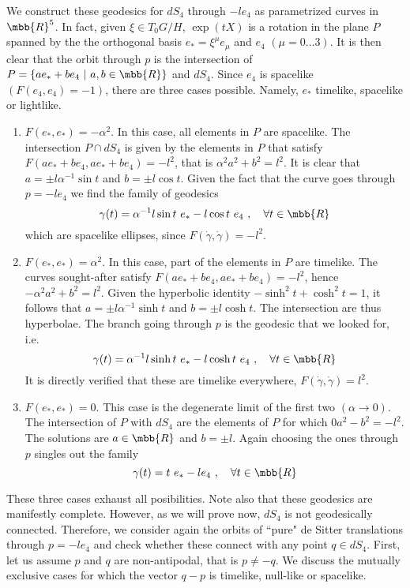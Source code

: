 \documentclass[11pt]{article}
\begin{document}
We construct these geodesics for $dS_4$ through $-le_4$ as 
parametrized curves in $\mbb{R}^5$. In fact, given $\xi \in 
T_0G/H$, $\exp (tX)$ is a rotation in the plane $P$ spanned by 
the the orthogonal basis $e_\ast = \xi^\mu e_\mu$ and $e_4$ $(\mu 
= 0\ldots 3)$.  It is then clear that the orbit through $p$ is 
the intersection of $P = \{a e_\ast + b e_4~|~a,b \in \mbb{R}\}$ 
and $dS_4$.  Since $e_4$ is spacelike $(F(e_4,e_4) = -1)$, there 
are three cases possible. Namely, $e_\ast$ timelike, spacelike or 
lightlike.
%
\begin{enumerate}
	\item $F(e_\ast,e_\ast) = -\alpha^2$. In this case, all 
		elements in $P$ are spacelike. The intersection $P \cap dS_4$ 
		is given by the elements in $P$ that satisfy $F(a e_\ast + b 
		e_4, a e_\ast + b e_4) = -l^2$, that is $\alpha^2 a^2 + b^2 = 
		l^2$. It is clear that $a= \pm l\alpha^{-1} \sin t$ and $b= 
		\pm l\cos t$. Given the fact that the curve goes through $p = 
		-le_4$ we find the family of geodesics
		\begin{equation}\label{eq:geo_space}
			\gamma(t) = \alpha^{-1}l\sin t~e_\ast - l \cos t~e_4~,
			\quad \forall t \in \mbb{R}
		\end{equation}
		which are spacelike ellipses, since 
		$F(\dot{\gamma},\dot{\gamma}) = -l^2$.
	\item $F(e_\ast,e_\ast) = \alpha^2$. In this case, part of the 
		elements in $P$ are timelike. The curves sought-after satisfy 
		$F(a e_\ast + b e_4, a e_\ast + b e_4) = -l^2$, hence 
		$-\alpha^2 a^2 + b^2 = l^2$. Given the hyperbolic identity 
		$-\sinh^2t + \cosh^2t = 1$, it follows that $a= \pm 
		l\alpha^{-1} \sinh t$ and $b= \pm l\cosh t$. The intersection 
		are thus hyperbolae.  The branch going through $p$ is the 
		geodesic that we looked for, i.e.\
		\begin{equation}\label{eq:geo_time}
			\gamma(t) = \alpha^{-1}l\sinh t~e_\ast - l\cosh t~e_4~,
			\quad \forall t \in \mbb{R}
		\end{equation}
		It is directly verified that these are timelike everywhere, 
		$F(\dot{\gamma},\dot{\gamma}) = l^2$.
	\item $F(e_\ast,e_\ast) = 0$. This case is the degenerate limit 
		of the first two $(\alpha \to 0)$. The intersection of $P$ 
		with $dS_4$ are the elements of $P$ for which $0a^2 - b^2 = 
		-l^2$. The solutions are $a \in \mbb{R}$ and $b = \pm l$.  
		Again choosing the ones through $p$ singles out the family
		\begin{equation}\label{eq:geo_null}
			\gamma(t) = t~e_\ast - le_4~,\quad \forall t \in \mbb{R}
		\end{equation}
\end{enumerate}
These three cases exhaust all posibilities. Note also that these 
geodesics are manifestly complete. However, as we will prove now, 
$dS_4$ is not geodesically connected. Therefore, we consider 
again the orbits of ``pure" de Sitter translations through $p = 
-le_4$ and check whether these connect with any point $q \in 
dS_4$. First, let us assume $p$ and $q$ are non-antipodal, that 
is $p \neq -q$. We discuss the mutually exclusive cases for which 
the vector $q-p$ is timelike, null-like or spacelike.
\end{document}
